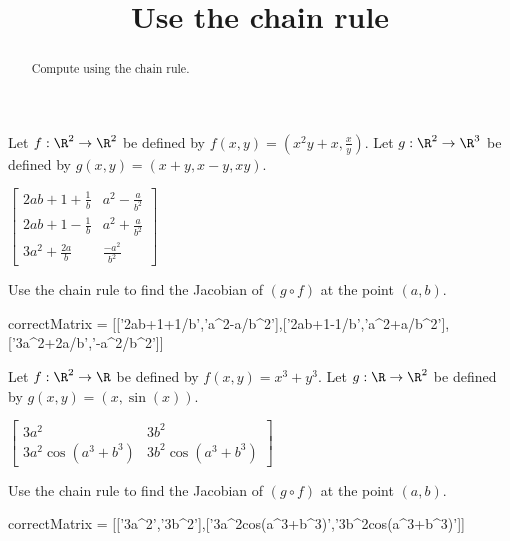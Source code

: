 \documentclass{ximera}
\title{Use the chain rule}
\begin{document}
	\begin{abstract}
		Compute using the chain rule.
	\end{abstract}
	
			
	\begin{question}
		Let $f:\R^2 \to \R^2$ be defined by $f(x,y)=(x^2y+x,\frac{x}{y})$.  Let 
		$g:\R^2 \to \R^3$ be defined by $g(x,y) = (x+y,x-y,xy)$.  
		\begin{solution}
			\begin{hint}
				\(\begin{bmatrix} 
				2ab+1+\frac{1}{b}& a^2-\frac{a}{b^2}\\
				2ab+1-\frac{1}{b}& a^2+\frac{a}{b^2}\\
				3a^2+\frac{2a}{b} & \frac{-a^2}{b^2}
				\end{bmatrix}\)
			\end{hint}
		Use the chain rule to find the
		Jacobian of $(g \circ f)$ at the point $(a,b)$.
		
		\begin{matrix-answer}
			correctMatrix = [['2ab+1+1/b','a^2-a/b^2'],['2ab+1-1/b','a^2+a/b^2'],['3a^2+2a/b','-a^2/b^2']]
		\end{matrix-answer}
		\end{solution}
	\end{question}	
	
	\begin{question}
		Let $f:\R^2 \to \R$ be defined by $f(x,y)=x^3+y^3$.  Let 
		$g:\R \to \R^2$ be defined by $g(x,y) = (x, \sin(x))$.  
		\begin{solution}
			\begin{hint}
				\(\begin{bmatrix} 
				3a^2& 3b^2\\
				3a^2\cos(a^3+b^3)& 3b^2\cos(a^3+b^3)
				\end{bmatrix}\)
			\end{hint}
		Use the chain rule to find the
		Jacobian of $(g \circ f)$ at the point $(a,b)$.
		
		\begin{matrix-answer}
			correctMatrix = [['3a^2','3b^2'],['3a^2cos(a^3+b^3)','3b^2cos(a^3+b^3)']]
		\end{matrix-answer}
		\end{solution}
	\end{question}	
	
\end{document}
